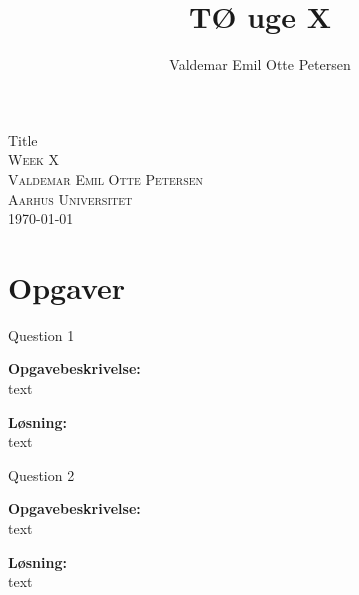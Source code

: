 \documentclass{article}
\author{Valdemar Emil Otte Petersen}
\title{TØ uge X}
\begin{document}
\begingroup

\centering 
{\LARGE Title}\\ %
\vspace*{1\baselineskip}
\scshape
Week X\\ %
Valdemar Emil Otte Petersen\\ %
{\small Aarhus Universitet}\\ 
{\small \today}

\endgroup

\section{Opgaver}
{\LARGE Question 1}

\textbf{Opgavebeskrivelse:}\\
text

\vspace{15px}
\textbf{Løsning:}\\
text

\vspace{35px}
{\LARGE Question 2}

\textbf{Opgavebeskrivelse:}\\
text

\vspace{15px}
\textbf{Løsning:}\\
text
\end{document}
